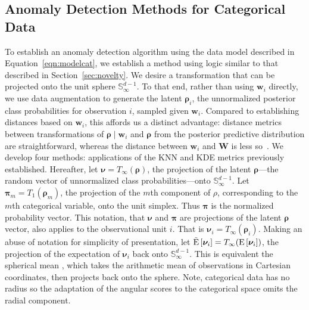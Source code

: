 \subsection{Anomaly Detection Methods for Categorical Data\label{subsec:catscores}}
To establish an anomaly detection algorithm using the data model described in 
    Equation~\ref{eqn:modelcat}, we establish a method using logic similar to 
    that described in Section~\ref{sec:novelty}.  We desire a transformation that 
    can be projected onto the unit sphere $\mathbb{S}_{\infty}^{d-1}$.  To that 
    end, rather than using $\bm{w}_i$ directly, we use data augmentation to 
    generate the latent $\bm{\rho}_i$, the unnormalized posterior class 
    probabilities for observation $i$, sampled given $\bm{w}_i$.  Compared to 
    establishing distances based on $\bm{w}_i$, this affords us a distinct 
    advantage: distance metrics between transformations of 
    $\bm{\rho}\mid\bm{w}_i$ and $\bm{\rho}$ from the posterior predictive 
    distribution are straightforward, whereas the distance between $\bm{w}_i$ 
    and $\bm{W}$ is less so~\citep{Alamuri2014}. We develop four methods: 
    applications of the KNN and KDE metrics previously established.  Hereafter, 
    let $\bm{\nu} = T_{\infty}\left(\bm{\rho}\right)$, the projection of the 
    latent $\bm{\rho}$---the random vector of unnormalized class 
    probabilities---onto $\mathbb{S}_{\infty}^{d-1}$.  Let 
    $\bm{\pi}_{m} = T_{1}(\bm{\rho}_m)$,
    the projection of the $m$th component of $\rho$, corresponding to the $m$th 
    categorical variable, onto the unit simplex. Thus $\bm{\pi}$ is the 
    normalized probability vector.  This notation, that $\bm{\nu}$ and 
    $\bm{\pi}$ are projections of the latent $\bm{\rho}$ vector, also applies 
    to the observational unit $i$.  That is 
    $\bm{\nu}_i = T_{\infty}(\bm{\rho}_i)$. Making an abuse of notation for 
    simplicity of presentation, let 
    $\tilde{\text{E}}\left[\bm{\nu}_i\right] = T_{\infty}(\text{E}\left[\bm{\nu}_i\right])$, 
    the projection of the expectation of $\bm{\nu}_i$ back onto 
    $\mathbb{S}_{\infty}^{d-1}$.  This is equivalent the spherical mean 
    \cite{mardia1999}, which takes the arithmetic mean of observations in 
    Cartesian coordinates, then projects back onto the sphere.  Note, 
    categorical data has no radius so the adaptation of the angular scores to 
    the categorical space omits the radial component.

